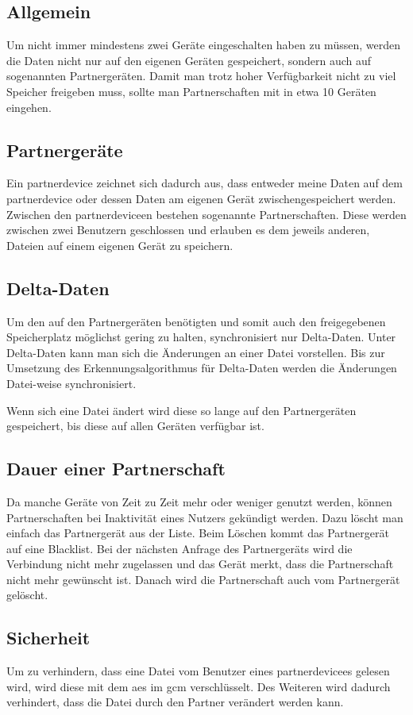 \subsection{Allgemein}
Um nicht immer mindestens zwei Geräte eingeschalten haben zu müssen, werden die
Daten nicht nur auf den eigenen Geräten gespeichert, sondern auch auf sogenannten
Partnergeräten. Damit man trotz hoher Verfügbarkeit nicht zu viel Speicher freigeben
muss, sollte man Partnerschaften mit in etwa 10 Geräten eingehen.

\subsection{Partnergeräte} \label{Partnergerät}
Ein \gls{partnerdevice} zeichnet sich dadurch aus, dass entweder meine Daten auf
dem \gls{partnerdevice} oder dessen Daten am eigenen Gerät zwischengespeichert werden.
Zwischen den \gls{partnerdevice}en bestehen sogenannte Partnerschaften. Diese werden
zwischen zwei Benutzern geschlossen und erlauben es dem jeweils anderen, Dateien auf
einem eigenen Gerät zu speichern.

\subsection{Delta-Daten}
Um den auf den Partnergeräten benötigten und somit auch den freigegebenen Speicherplatz
möglichst gering zu halten, synchronisiert \sblit nur Delta-Daten. Unter Delta-Daten
kann man sich die Änderungen an einer Datei vorstellen. Bis zur Umsetzung des
Erkennungsalgorithmus für Delta-Daten werden die Änderungen Datei-weise synchronisiert.

Wenn sich eine Datei ändert wird diese so lange auf den Partnergeräten gespeichert,
bis diese auf allen Geräten verfügbar ist.

\subsection{Dauer einer Partnerschaft}
Da manche Geräte von Zeit zu Zeit mehr oder weniger genutzt werden, können Partnerschaften
bei Inaktivität eines Nutzers gekündigt werden. Dazu löscht man einfach das Partnergerät
aus der Liste. Beim Löschen kommt das Partnergerät auf eine Blacklist. Bei der nächsten
Anfrage des Partnergeräts wird die Verbindung nicht mehr zugelassen und das Gerät merkt,
dass die Partnerschaft nicht mehr gewünscht ist. Danach wird die Partnerschaft auch vom
Partnergerät gelöscht.

\subsection{Sicherheit} \label{sicherheit}
Um zu verhindern, dass eine Datei vom Benutzer eines \gls{partnerdevice}es gelesen wird,
wird diese mit dem \gls{aes} im \gls{gcm} verschlüsselt. Des Weiteren wird dadurch
verhindert, dass die Datei durch den Partner verändert werden kann.

